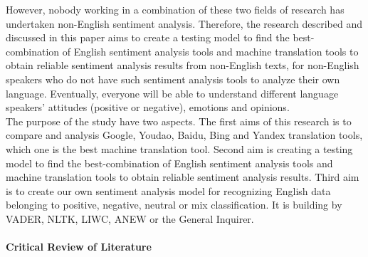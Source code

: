 \documentclass[conference]{IEEEtran}
\begin{document}
However, nobody working in a combination of these two fields of research has undertaken non-English
sentiment analysis. Therefore, the research described and discussed in this paper aims to create a testing model to find the best-combination of English
sentiment analysis tools and machine translation tools to obtain reliable
sentiment analysis results from non-English texts, for non-English speakers who
do not have such sentiment analysis tools to analyze their own language.
Eventually, everyone will be able to understand different language speakers'
attitudes (positive or negative), emotions and opinions.\\
The purpose of the study have two aspects.
The first aims of this research is to compare and analysis Google, Youdao, Baidu, Bing and
Yandex translation tools, which one is the best machine translation tool.
Second aim is creating a testing model to find the best-combination of English
sentiment analysis tools and machine translation tools to obtain reliable
sentiment analysis results.
Third aim is to create our own sentiment analysis model for
recognizing English data belonging to positive, negative, neutral or mix
classification. It is building by VADER, NLTK, LIWC, ANEW or the General Inquirer.
\paragraph{Critical Review of Literature}
\end{document}
